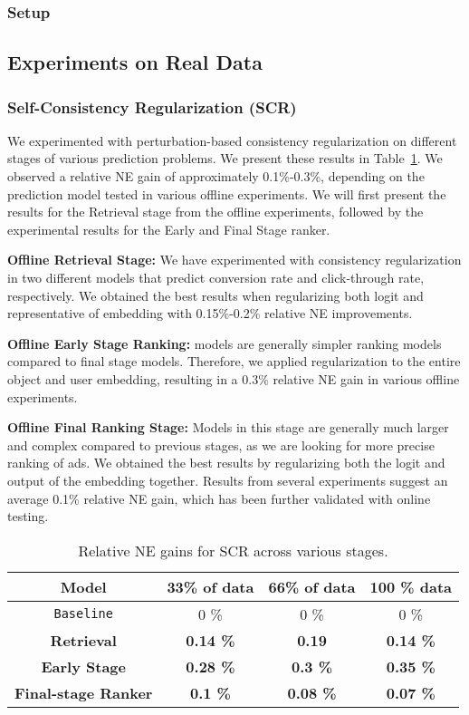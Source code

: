 \subsubsection{Setup}


\subsection{Experiments on Real Data}
\label{subsec:real_data}
\subsubsection{Self-Consistency Regularization (SCR)}

We experimented with perturbation-based consistency regularization on different stages of various prediction problems. We present these results in Table~\ref{tab:rel_ne}.
We observed a relative NE gain of approximately 0.1\%-0.3\%, depending on the prediction model tested in various offline experiments.
We will first present the results for the Retrieval stage from the offline experiments, followed by the experimental results for the Early and Final Stage ranker.

\noindent\textbf{Offline Retrieval Stage:} We have experimented with consistency regularization in two different models that predict conversion rate and click-through rate, respectively. 
We obtained the best results when regularizing both logit and representative of embedding with 0.15\%-0.2\% relative NE improvements.

\noindent\textbf{Offline Early Stage Ranking:} models are generally simpler ranking models compared to final stage models. Therefore, we applied regularization to the entire object and user embedding, resulting in a 0.3\% relative NE gain in various offline experiments.


\noindent\textbf{Offline Final Ranking Stage:} 
Models in this stage are generally much larger and complex compared to previous stages, as we are looking for more precise ranking of ads. 
We obtained the best results by regularizing both the logit and output of the embedding together.
Results from several experiments suggest an average 0.1\% relative NE gain, which has been further validated with online testing.


\begin{table}
  \caption{Relative NE gains for SCR across various stages.}
  \label{tab:rel_ne}
    \centering
  \begin{tabular}{cccc}
  \toprule
    Model & 33\% of data &  66\% of data & 100 \% data\\
    \midrule
    \texttt{Baseline} & 0 \% & 0 \% &  0 \% \\
    \textbf{Retrieval} & \bf{0.14 \%} & \bf{0.19} &  \bf{0.14 \%}\\
    \textbf{Early Stage} & \bf{0.28 \%} & \bf{0.3 \%} &  \bf{0.35 \%}\\
    \textbf{Final-stage Ranker} & \bf{0.1 \%} & \bf{0.08 \%} &  \bf{0.07 \%}\\
    \bottomrule
  \end{tabular}
\end{table}

